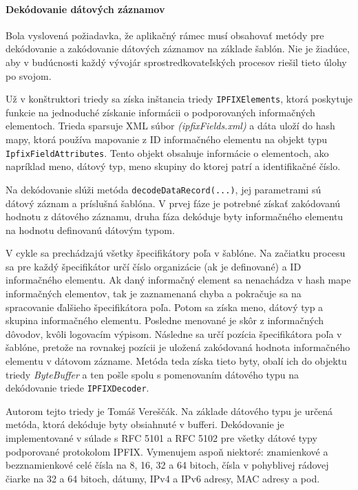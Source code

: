 \paragraph{Dekódovanie dátových záznamov} 
Bola vyslovená požiadavka, že aplikačný rámec musí obsahovať metódy pre dekódovanie a zakódovanie 
dátových záznamov na základe šablón. Nie je žiadúce, aby v budúcnosti každý vývojár sprostredkovateľských 
procesov riešil tieto úlohy po svojom. 

Už v konštruktori triedy sa získa inštancia triedy \verb|IPFIXElements|, ktorá poskytuje 
funkcie na jednoduché získanie informácii o podporovaných informačných elementoch. Trieda sparsuje XML 
súbor \emph{(ipfixFields.xml)} a dáta uloží do hash mapy, ktorá používa mapovanie z ID informačného 
elementu na objekt typu \verb|IpfixFieldAttributes|. Tento objekt obsahuje informácie o elementoch, ako 
napríklad meno, dátový typ, meno skupiny do ktorej patrí a identifikačné číslo.\citep{veri}

Na dekódovanie slúži metóda \verb|decodeDataRecord(...)|, jej parametrami sú dátový záznam a príslušná
šablóna. V prvej fáze je potrebné získať zakódovanú hodnotu z dátového záznamu, druha fáza dekóduje 
byty informačného elementu na hodnotu definovanú dátovým typom.

V cykle sa prechádzajú všetky špecifikátory poľa v šablóne. Na začiatku procesu sa pre každý 
špecifikátor určí číslo organizácie (ak je definované) a ID informačného elementu. Ak daný informačný
element sa nenachádza v hash mape informačných elementov, tak je zaznamenaná chyba a pokračuje sa 
na spracovanie ďalšieho špecifikátora poľa. Potom sa získa meno, dátový typ a skupina informačného elementu. 
Posledne menované je skôr z informačných dôvodov, kvôli logovacím výpisom. Následne sa určí pozícia 
špecifikátora poľa v šablóne, pretože na rovnakej pozícii je uložená zakódovaná hodnota informačného
elementu v dátovom zázname. Metóda teda získa tieto byty, obalí ich do objektu triedy \emph{ByteBuffer}  
a ten pošle spolu s pomenovaním dátového typu na dekódovanie triede \verb|IPFIXDecoder|.

Autorom tejto triedy je Tomáš Vereščák. Na základe dátového typu je určená metóda, ktorá dekóduje 
byty obsiahnuté v bufferi. Dekódovanie je implementované v súlade s RFC 5101 \citep{rfc5101} a 
RFC 5102 \citep{rfc5102} pre všetky dátové typy podporované protokolom IPFIX. Vymenujem aspoň niektoré:
znamienkové a bezznamienkové celé čísla na 8, 16, 32 a 64 bitoch, čísla v pohyblivej rádovej čiarke na 
32 a 64 bitoch, dátumy, IPv4 a IPv6 adresy, MAC adresy a pod. 

